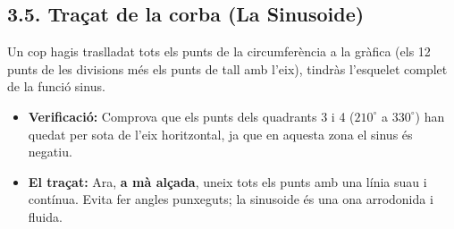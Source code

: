 \documentclass[12pt,a4paper]{article}
\begin{document}
\newpage
\subsection*{3.5. Traçat de la corba (La Sinusoide)}

Un cop hagis traslladat tots els punts de la circumferència a la gràfica (els 12 punts de les divisions més els punts de tall amb l'eix), tindràs l'esquelet complet de la funció sinus.

\begin{itemize}
    \item \textbf{Verificació:} Comprova que els punts dels quadrants 3 i 4 ($210^\circ$ a $330^\circ$) han quedat per sota de l'eix horitzontal, ja que en aquesta zona el sinus és negatiu.
    \item \textbf{El traçat:} Ara, \textbf{a mà alçada}, uneix tots els punts amb una línia suau i contínua. Evita fer angles punxeguts; la sinusoide és una ona arrodonida i fluida.
\end{itemize}
\end{document}
